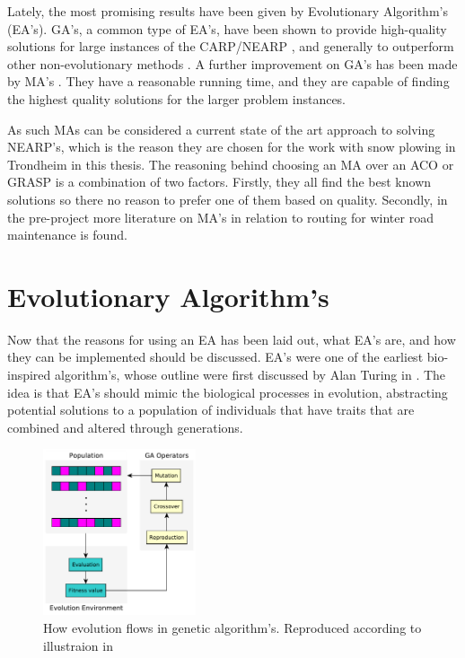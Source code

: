Lately, the most promising results have been given by Evolutionary Algorithm's (EA's). GA's, a common type of EA's, have been shown to provide high-quality solutions for large instances of the CARP/NEARP \citep{lacomme2001GA}, and generally to outperform other non-evolutionary methods \citep{wohlk2008decade}. A further improvement on GA's has been made by MA's \citep{prins2005memeticNEARP}. They have a reasonable running time, and they are capable of finding the highest quality solutions for the larger problem instances.

As such MAs can be considered a current state of the art approach to solving NEARP's, which is the reason they are chosen for the work with snow plowing in Trondheim in this thesis. The reasoning behind choosing an MA over an ACO or GRASP is a combination of two factors. Firstly, they all find the best known solutions so there no reason to prefer one of them based on quality. Secondly, in the pre-project \citep{forprosjektet} more literature on MA's in relation to routing for winter road maintenance is found.


\section{Evolutionary Algorithm's} %
\label{sec:evolutionary_algorithms}
Now that the reasons for using an EA has been laid out, what EA's are, and how they can be implemented should be discussed. EA's were one of the earliest bio-inspired algorithm's, whose outline were first discussed by Alan Turing in \citet{turing1950computing}. The idea is that EA's should mimic the biological processes in evolution, abstracting potential solutions to a population of individuals that have traits that are combined and altered through generations.


\begin{figure}
    \begin{center}
        \includegraphics[width=0.4\textwidth]{figures/GA_general_flow_illustration.pdf}
    \end{center}
    \caption{How evolution flows in genetic algorithm's. Reproduced according to illustraion in \citet{gaFlowIllustrationSource}}
    \label{fig:ga_flow_illustraion}
\end{figure}

